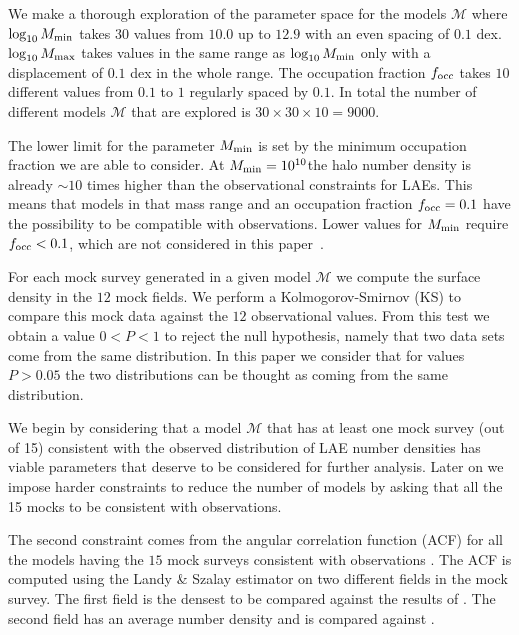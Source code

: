 \documentclass[usenatbib]{mn2e}
\newcommand{\documentname}{paper~}
\newcommand{\hMsun}{{\ifmmode{h^{-1}{\rm
        {M_{\odot}}}}\else{$h^{-1}{\rm{M_{\odot}}}$}\fi}}
\begin{document}
We make a thorough exploration of the parameter space for the models
${\mathcal M}$ where $\log_{10} M_{\rm min}$ takes $30$ values from $10.0$ up
to $12.9$ with an even spacing of $0.1$ dex. $\log_{10} M_{\rm max}$
takes values in the same range as $\log_{10}M_{\rm min}$ only with a
displacement of $0.1$ dex in the whole range. The occupation fraction
$f_{\rm occ}$ takes $10$ different values from $0.1$ to $1$ regularly
spaced by $0.1$. In total the number of different models ${\mathcal
  M}$ that are explored is $30 \times 30 \times 10 = 9000$. 


The lower limit for the parameter $M_{\rm min}$ is set by the minimum
occupation fraction we are able to consider. At $M_{\rm
  min}=10^{10}$\hMsun the halo number density is already $\sim 10$
times higher than the observational constraints for LAEs. This means
that models in that mass range and an occupation fraction $f_{\rm
  occ}=0.1$ have the possibility to be compatible with observations. Lower
values for $M_{\rm min}$ require $f_{\rm occ}<0.1$, which are not
considered in this \documentname. 

For each mock survey generated in a given model ${\mathcal M}$ we
compute the surface density in the $12$ mock fields. We perform a
Kolmogorov-Smirnov (KS) to compare this mock data against the $12$
observational values. From this test we obtain a value $0<P<1$ to
reject the null hypothesis, namely that two data sets come from the
same distribution. In this paper we consider that for values $P>0.05$
the two distributions can be thought as coming from the same
distribution.

We begin by considering that  a model ${\mathcal M}$ that has at least
one mock survey (out of 15) consistent with the observed
distribution of LAE number densities has viable parameters that
deserve to be considered for further analysis. Later on we impose
harder constraints to reduce the number of models by asking that all
the 15 mocks to be consistent with observations.

The second constraint  comes from the angular correlation function (ACF)
for all the models having the $15$ mock surveys consistent with
observations . The ACF is computed using 
the Landy \&  Szalay estimator \citep{Landy1993}  on two different 
fields in the mock survey. The first field is the densest to be compared
against the results of \cite{Hayashino2004}. The second field
has an average number density and is compared against \cite{Ouchi2010}.
\end{document}
